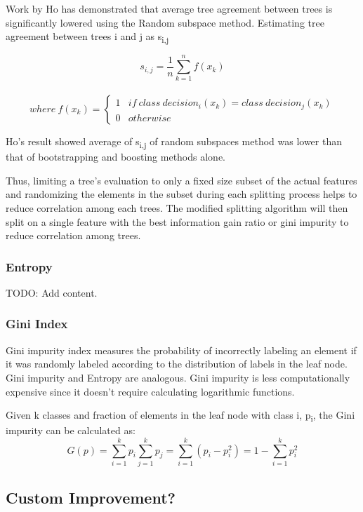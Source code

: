 \documentclass{article} %
\begin{document}
 Work by Ho has demonstrated that average tree agreement between trees is significantly lowered using the Random subspace method. \cite{Ho98}
Estimating tree agreement between trees i and j as s\textsubscript{i,j}

\[ s_{i,j} = \frac{1}{n}\sum_{k=1}^{n}f(x_k)\]
\
\[ where \ f(x_k) = \begin{cases}
      1 & if\ class\ decision_i(x_k) = class \ decision_j(x_k) \\
      0 & otherwise
   \end{cases}
\]

Ho's result showed average of s\textsubscript{i,j} of random subspaces method was lower than that of bootstrapping and boosting methods alone. \cite{Ho98}

 Thus, limiting a tree's evaluation to only a fixed size subset of the actual features and randomizing the elements in the subset during each splitting process helps to reduce correlation among each trees. The modified splitting algorithm will then split on a single feature with the best information gain ratio or gini impurity to reduce correlation among trees.

\subsubsection{Entropy}
TODO: Add content.

\subsubsection{Gini Index}
Gini impurity index measures the probability of incorrectly labeling an element if it was randomly labeled according to the distribution of labels in the leaf node. Gini impurity and Entropy are analogous. Gini impurity is less computationally expensive since it doesn't require calculating logarithmic functions.

Given k classes and fraction of elements in the leaf node with class i, p\textsubscript{i}, the Gini impurity can be calculated as:
\[G(p) = \sum_{i=1}^{k}p_i \sum_{j=1}^{k}p_j = \sum_{i=1}^{k}(p_i-p_i^2) = 1 - \sum_{i=1}^{k}p_i^2 \]

\subsection{Custom Improvement?}
\end{document}
